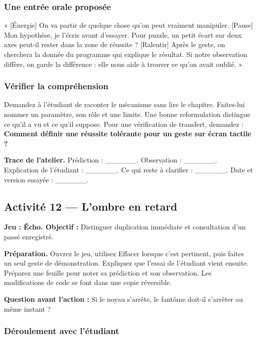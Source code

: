 \documentclass[
  canadien,
  11pt,
  letterpaper,
]{article}
\begin{document}
\subsubsection{Une entrée orale
proposée}\label{une-entruxe9e-orale-proposuxe9e-10}

« {[}Énergie{]} On va partir de quelque chose qu'on peut vraiment
manipuler. {[}Pause{]} Mon hypothèse, je l'écris avant d'essayer. Pour
puzzle, un petit écart sur deux axes peut-il rester dans la zone de
réussite ? {[}Ralentir{]} Après le geste, on cherchera la donnée du
programme qui explique le résultat. Si notre observation diffère, on
garde la différence : elle nous aide à trouver ce qu'on avait oublié. »

\subsubsection{Vérifier la
compréhension}\label{vuxe9rifier-la-compruxe9hension-10}

Demandez à l'étudiant de raconter le mécanisme sans lire le chapitre.
Faites-lui nommer un paramètre, son rôle et une limite. Une bonne
reformulation distingue ce qu'il a vu et ce qu'il suppose. Pour une
vérification de transfert, demandez : \textbf{Comment définir une
réussite tolérante pour un geste sur écran tactile ?}

\textbf{Trace de l'atelier.} Prédiction : \_\_\_\_\_\_. Observation :
\_\_\_\_\_\_. Explication de l'étudiant : \_\_\_\_\_\_. Ce qui reste à
clarifier : \_\_\_\_\_\_. Date et version essayée : \_\_\_\_\_\_.

\subsection{Activité 12 --- L'ombre en
retard}\label{activituxe9-12-lombre-en-retard}

\textbf{Jeu : Écho. Objectif :} Distinguer duplication immédiate et
consultation d'un passé enregistré.

\textbf{Préparation.} Ouvrez le jeu, utilisez Effacer lorsque c'est
pertinent, puis faites un seul geste de démonstration. Expliquez que
l'essai de l'étudiant vient ensuite. Préparez une feuille pour noter sa
prédiction et son observation. Les modifications de code se font dans
une copie réversible.

\textbf{Question avant l'action :} Si le noyau s'arrête, le fantôme
doit-il s'arrêter au même instant ?

\subsubsection{Déroulement avec
l'étudiant}\label{duxe9roulement-avec-luxe9tudiant-11}
\end{document}
